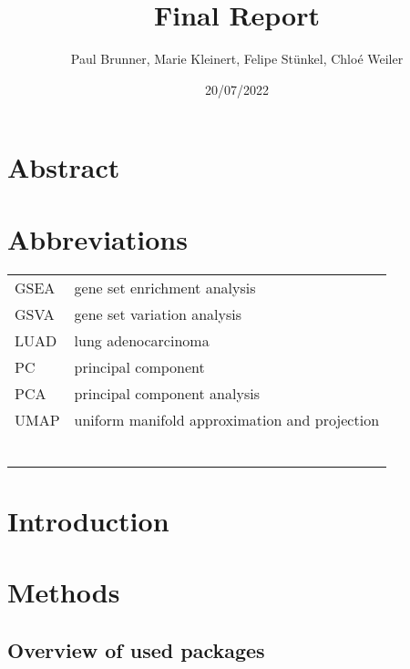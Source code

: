 \documentclass[
]{article}
\title{Final Report}
\author{Paul Brunner, Marie Kleinert, Felipe Stünkel, Chloé Weiler}
\date{20/07/2022}
\begin{document}
\maketitle

\hypertarget{abstract}{%
\section{Abstract}\label{abstract}}

\hypertarget{abbreviations}{%
\section{Abbreviations}\label{abbreviations}}

\begin{longtable}[]{@{}ll@{}}
\toprule
\endhead
GSEA & gene set enrichment analysis \\
GSVA & gene set variation analysis \\
LUAD & lung adenocarcinoma \\
PC & principal component \\
PCA & principal component analysis \\
UMAP & uniform manifold approximation and projection \\
& \\
& \\
& \\
& \\
& \\
& \\
\bottomrule
\end{longtable}

\hypertarget{introduction}{%
\section{Introduction}\label{introduction}}

\hypertarget{methods}{%
\section{Methods}\label{methods}}

\hypertarget{overview-of-used-packages}{%
\subsection{Overview of used packages}\label{overview-of-used-packages}}
\end{document}
